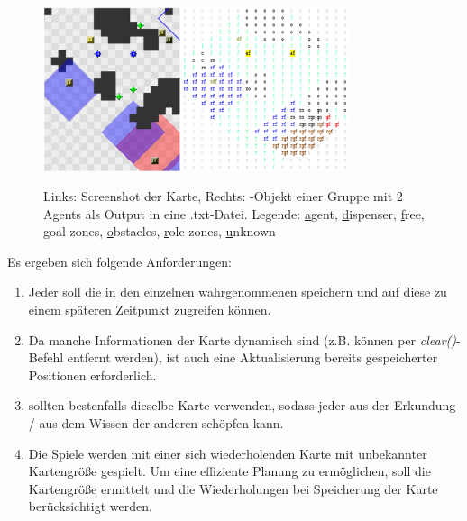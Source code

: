 \begin{figure}[h]
	\includegraphics[width=0.8\textwidth]{./Abbildungen/map.png}
	\centering
	\label{fig:interneKarte}
	\caption{Links: Screenshot der Karte, Rechts: \NextMap-Objekt einer Gruppe mit 2 Agents als Output in eine .txt-Datei. \newline Legende: \underline{a}gent, \underline{d}ispenser, \underline{f}ree, \underline{g}oal zones, \underline{o}bstacles, \underline{r}ole zones, \underline{u}nknown}
\end{figure} 

Es ergeben sich folgende Anforderungen:
\begin{enumerate}
	\item Jeder \Agent soll die in den einzelnen \Steps wahrgenommenen \Things speichern und auf diese zu einem späteren Zeitpunkt zugreifen können. 
	\item Da manche Informationen der Karte dynamisch sind (z.B. können \Obstacles per \textit{clear()}-Befehl entfernt werden), ist auch eine Aktualisierung bereits gespeicherter Positionen erforderlich. 
	\item \Agents sollten bestenfalls dieselbe Karte verwenden, sodass jeder \Agent aus der Erkundung / aus dem Wissen der anderen \Agents schöpfen kann.
	\item Die Spiele werden mit einer sich wiederholenden Karte mit unbekannter Kartengröße gespielt. Um eine effiziente Planung zu ermöglichen, soll die Kartengröße ermittelt und die Wiederholungen bei Speicherung der Karte berücksichtigt werden.
\end{enumerate}

